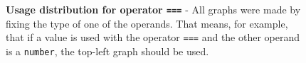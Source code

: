 \begin{figure}[tp]
	\caption[Usage distribution for operator ===]{\textbf{Usage distribution for operator \texttt{===}} - All graphs were made by fixing the type of one of the operands. That means, for example, that if a value is used with the operator \texttt{===} and the other operand is a \texttt{number}, the top-left graph should be used.}
	\label{fig:type-inference-proposal-scoring-strict-equal}
\end{figure}
